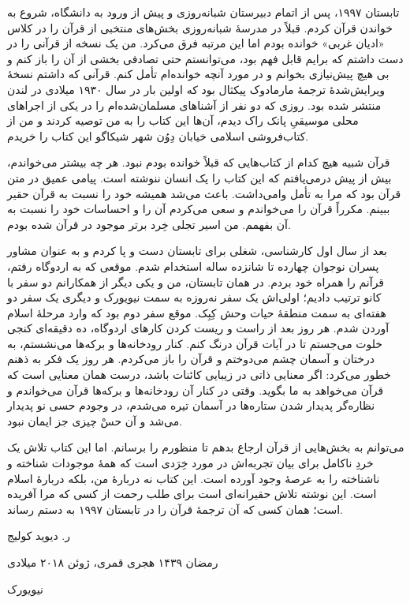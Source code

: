تابستان ۱۹۹۷، پس از اتمام دبیرستان شبانه‌روزی‌ و پیش از ورود به دانشگاه، شروع به خواندن قرآن کردم. قبلاً در مدرسهٔ شبانه‌روزی بخش‌های منتخبی از قرآن را در کلاس «ادیان غربی» خوانده بودم اما این مرتبه فرق می‌کرد. من یک نسخه از قرآنی را در دست داشتم که برایم قابل فهم بود، می‌توانستم حتی تصادفی بخشی از آن را باز کنم و بی هیچ پیش‌نیازی بخوانم و در مورد آنچه خوانده‌ام تأمل کنم. قرآنی که داشتم نسخهٔ ویرایش‌شدهٔ ترجمهٔ مارمادوک پیکثال
بود که اولین بار در سال ۱۹۳۰ میلادی در لندن منتشر شده بود. روزی که دو نفر از آشناهای مسلمان‌شده‌ام را در یکی از اجراهای محلی موسیقیِ پانک‌ راک
دیدم، آن‌ها این کتاب را به من توصیه کردند و من از کتاب‌فروشی اسلامی خیابان دِوُن 
شهر شیکاگو این کتاب را خریدم.


قرآن شبیه هیچ کدام از کتاب‌هایی که قبلاً خوانده بودم نبود. هر چه بیشتر می‌خواندم، بیش از پیش درمی‌یافتم که این کتاب را یک انسان ننوشته است. پیامی عمیق در متن قرآن بود که مرا به تأمل وامی‌داشت. باعث می‌شد همیشه خود را نسبت به قرآن حقیر ببینم. مکرراً قرآن را می‌خواندم و سعی می‌کردم آن را و  احساسات خود را نسبت به آن بفهمم. من اسیر تجلی  خِرد برتر موجود در قرآن شده بودم. 

بعد از سال اول کارشناسی، شغلی برای تابستان دست و پا کردم و به عنوان مشاور پسران نوجوان چهارده تا شانزده ساله استخدام شدم. موقعی که به اردوگاه رفتم، قرآنم را همراه خود بردم. در همان تابستان، من و یکی دیگر از همکارانم دو سفر با کانو ترتیب دادیم؛‌ اولی‌اش یک سفر نه‌روزه به سمت نیویورک و دیگری یک سفر دو هفته‌ای به سمت منطقهٔ حیات وحش کِبِک. موقع سفر دوم بود که وارد مرحلهٔ اسلام آوردن شدم. هر روز بعد از راست و ریست کردن کارهای اردوگاه، ده دقیقه‌ای کنجی خلوت می‌جستم تا در آیات قرآن درنگ کنم. کنار رودخانه‌ها و برکه‌ها می‌نشستم، به درختان و آسمان چشم می‌دوختم و قرآن را باز می‌کردم. هر روز یک فکر به ذهنم خطور می‌کرد: اگر معنایی ذاتی در زیبایی کائنات باشد، درست همان معنایی است که قرآن می‌خواهد به ما بگوید. وقتی در کنار آن رودخانه‌ها و برکه‌ها قرآن می‌خواندم و نظاره‌گر پدیدار شدن ستاره‌ها در آسمان تیره می‌شدم، در وجودم حسی نو پدیدار می‌شد و آن حسْ چیزی جز ایمان نبود.


می‌توانم به بخش‌هایی از قرآن ارجاع بدهم تا منظورم را برسانم. اما این کتاب تلاش یک خردِ ناکامل برای بیان تجربه‌اش در مورد خِرَدی است که همهٔ موجودات شناخته و ناشناخته را به عرصهٔ‌ وجود آورده است. این کتاب نه دربارهٔ من، بلکه دربارهٔ اسلام است. این نوشته تلاش حقیرانه‌ای است برای طلب رحمت از کسی که مرا آفریده است؛ همان کسی که آن ترجمهٔ‌ قرآن را در تابستان ۱۹۹۷ به دستم رساند. 

\enlargethispage{2\baselineskip}
  \begin{samepage}
\begin{flushleft}
	{
	
	ر. دیوید کولیج
	
	رمضان ۱۴۳۹ هجری قمری،	ژوئن ۲۰۱۸ میلادی
	
	نیویورک
}
\end{flushleft}
\end{samepage}






